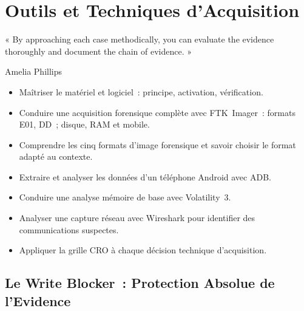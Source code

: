 
\chapter{Outils et Techniques d'Acquisition}
\label{chap:acq}

\epigraph{%
    « By approaching each case methodically, you can evaluate the evidence
    thoroughly and document the chain of evidence. »%
}{Amelia Phillips}


\begin{boxobjectifs}
\begin{itemize}
    \item Maîtriser le  matériel et logiciel~:
          principe, activation, vérification.
    \item Conduire une acquisition forensique complète avec FTK~Imager~:
          formats E01, DD~; disque, RAM et mobile.
    \item Comprendre les cinq formats d'image forensique et savoir choisir
          le format adapté au contexte.
    \item Extraire et analyser les données d'un téléphone Android avec ADB.
    \item Conduire une analyse mémoire de base avec Volatility~3.
    \item Analyser une capture réseau avec Wireshark pour identifier
          des communications suspectes.
    \item Appliquer la grille CRO à chaque décision technique d'acquisition.
\end{itemize}
\end{boxobjectifs}

\bigskip

\section{Le Write Blocker~: Protection Absolue de l'Evidence}
\label{sec:write-blocker}

